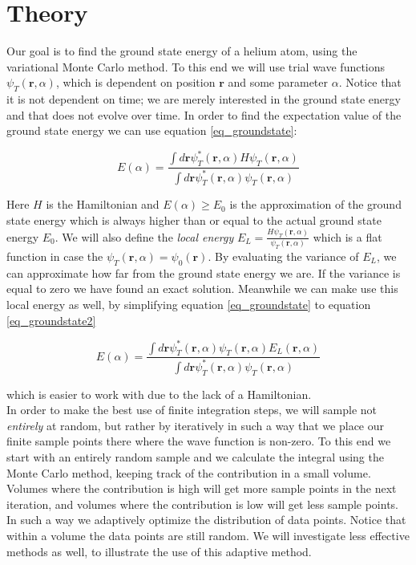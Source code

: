 

\section{Theory}

Our goal is to find the ground state energy of a helium atom, using the variational Monte Carlo method. To this end we will use trial wave functions $\psi_T(\textbf{r},\alpha)$, which is dependent on position $\textbf{r}$ and some parameter $\alpha$. Notice that it is not dependent on time; we are merely interested in the ground state energy and that does not evolve over time. In order to find the expectation value of the ground state energy we can use equation \ref{eq_groundstate}: 

\begin{equation}\label{eq_groundstate}
E(\alpha) = \frac{\int d\textbf{r} \psi_T^*(\textbf{r},\alpha)H\psi_T(\textbf{r},\alpha)}{\int d\textbf{r} \psi_T^*(\textbf{r},\alpha)\psi_T(\textbf{r},\alpha)}
\end{equation}

Here $H$ is the Hamiltonian and $E(\alpha) \geq E_0$ is the approximation of the ground state energy which is always higher than or equal to the actual ground state energy $E_0$.  We will also define the \textit{local energy} $E_L = \frac{H\psi_T(\textbf{r},\alpha)}{\psi_T(\textbf{r},\alpha)}$ which is a flat function in case the $\psi_T(\textbf{r},\alpha) = \psi_0(\textbf{r})$. By evaluating the variance of $E_L$, we can approximate how far from the ground state energy we are. If the variance is equal to zero we have found an exact solution. Meanwhile we can make use this local energy as well, by simplifying equation \ref{eq_groundstate} to equation \ref{eq_groundstate2}

\begin{equation}\label{eq_groundstate2}
E(\alpha) = \frac{\int d\textbf{r} \psi_T^*(\textbf{r},\alpha)\psi_T(\textbf{r},\alpha)E_L(\textbf{r},\alpha)}{\int d\textbf{r} \psi_T^*(\textbf{r},\alpha)\psi_T(\textbf{r},\alpha)}
\end{equation}

which is easier to work with due to the lack of a Hamiltonian. \\

In order to make the best use of finite integration steps, we will sample not \textit{entirely} at random, but rather by iteratively in such a way that we place our finite sample points there where the wave function is non-zero. To this end we start with an entirely random sample and we calculate the integral using the Monte Carlo method, keeping track of the contribution in a small volume. Volumes where the contribution is high will get more sample points in the next iteration, and volumes where the contribution is low will get less sample points. In such a way we adaptively optimize the distribution of data points. Notice that within a volume the data points are still random. We will investigate less effective methods as well, to illustrate the use of this adaptive method. 